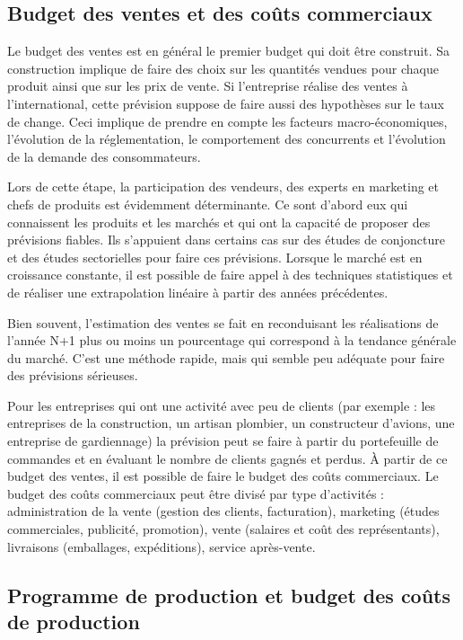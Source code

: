 \documentclass[oneside]{kaobook}
\begin{document}
\subsection{Budget des ventes et des coûts commerciaux}
\label{sec:org213be6a}
Le budget des ventes est en général le premier budget qui doit être construit. Sa construction implique de faire des choix sur les quantités vendues pour chaque produit ainsi que sur les prix de vente. Si l'entreprise réalise des ventes à l'international, cette prévision suppose de faire aussi des hypothèses sur le taux de change. Ceci implique de prendre en compte les facteurs macro-économiques, l'évolution de la réglementation, le comportement des concurrents et l'évolution de la demande des consommateurs.

Lors de cette étape, la participation des vendeurs, des experts en marketing et chefs de produits est évidemment déterminante. Ce sont d'abord eux qui connaissent les produits et les marchés et qui ont la capacité de proposer des prévisions fiables. Ils s'appuient dans certains cas sur des études de conjoncture et des études sectorielles pour faire ces prévisions. Lorsque le marché est en croissance constante, il est possible de faire appel à des techniques statistiques et de réaliser une extrapolation linéaire à partir des années précédentes.

Bien souvent, l'estimation des ventes se fait en reconduisant les réalisations de l'année N+1 plus ou moins un pourcentage qui correspond à la tendance générale du marché. C'est une méthode rapide, mais qui semble peu adéquate pour faire des prévisions sérieuses.

Pour les entreprises qui ont une activité avec peu de clients (par exemple : les entreprises de la construction, un artisan plombier, un constructeur d'avions, une entreprise de gardiennage) la prévision peut se faire à partir du portefeuille de commandes et en évaluant le nombre de clients gagnés et perdus.
À partir de ce budget des ventes, il est possible de faire le budget des coûts commerciaux. Le budget des coûts commerciaux peut être divisé par type d'activités : administration de la vente (gestion des clients, facturation), marketing (études commerciales, publicité, promotion), vente (salaires et coût des représentants), livraisons (emballages, expéditions), service après-vente.

\subsection{Programme de production et budget des coûts de production}
\label{sec:orgc160760}
\end{document}
